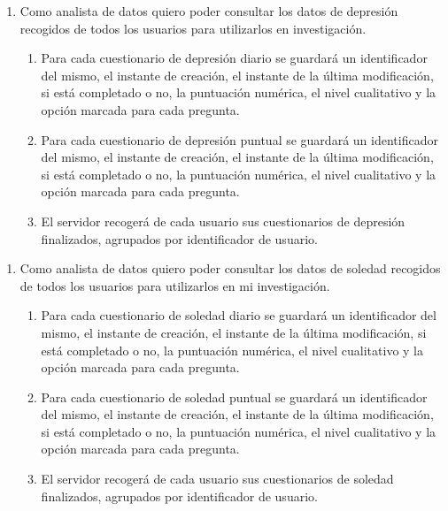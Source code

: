         \begin{enumerate}[resume=req-usuario,label=\textbf{\texttt{RU-\arabic*}}]
            \item \label{req:usuario:analista_depresion} Como analista de datos quiero poder consultar los datos de depresión recogidos de todos los usuarios para utilizarlos en investigación.
            \begin{enumerate}[resume=req-funcionales,label=\textbf{\texttt{RF-\arabic*}}]
                 \item \label{req:funcionales:depresion_diario_formato} Para cada cuestionario de depresión diario se guardará un identificador del mismo, el instante de creación, el instante de la última modificación, si está completado o no, la puntuación numérica, el nivel cualitativo y la opción marcada para cada pregunta.
                \item \label{req:funcionales:depresion_puntual_formato} Para cada cuestionario de depresión puntual se guardará un identificador del mismo, el instante de creación, el instante de la última modificación, si está completado o no, la puntuación numérica, el nivel cualitativo y la opción marcada para cada pregunta.
                \item \label{req:funcionales:depresion_finalizado_servidor} El servidor recogerá de cada usuario sus cuestionarios de depresión finalizados, agrupados por identificador de usuario.
            \end{enumerate}
        \end{enumerate}
        \begin{enumerate}[resume=req-usuario,label=\textbf{\texttt{RU-\arabic*}}]
            \item \label{req:usuario:analista_soledad} Como analista de datos quiero poder consultar los datos de soledad recogidos de todos los usuarios para utilizarlos en mi investigación.
            \begin{enumerate}[resume=req-funcionales,label=\textbf{\texttt{RF-\arabic*}}]
                \item \label{req:funcionales:soledad_diario_formato} Para cada cuestionario de soledad diario se guardará un identificador del mismo, el instante de creación, el instante de la última modificación, si está completado o no, la puntuación numérica, el nivel cualitativo y la opción marcada para cada pregunta.
                \item \label{req:funcionales:soledad_puntual_formato} Para cada cuestionario de soledad puntual se guardará un identificador del mismo, el instante de creación, el instante de la última modificación, si está completado o no, la puntuación numérica, el nivel cualitativo y la opción marcada para cada pregunta.
                \item \label{req:funcionales:soledad_finalizado_servidor} El servidor recogerá de cada usuario sus cuestionarios de soledad finalizados, agrupados por identificador de usuario.
            \end{enumerate}
        \end{enumerate}
